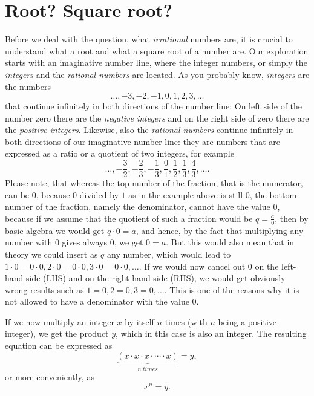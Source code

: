 \documentclass[11pt]{amsart}
\theoremstyle{definition}
\begin{document}
\section{Root? Square root?}
Before we deal with the question, what \emph{irrational} numbers are, it is crucial to understand what a root and what a square root of a number are. Our exploration starts with an imaginative number line, where the integer numbers, or simply the \emph{integers} and the \emph{rational numbers} are located.
As you probably know, \emph{integers} are the numbers
\begin{equation*}
    \dots , -3, -2, -1, 0, 1, 2, 3, \dots
\end{equation*}
that continue infinitely in both directions of the number line:
On left side of the number zero there are the \emph{negative integers} and on the right side of zero there are the \emph{positive integers}.
Likewise, also the \emph{rational numbers} continue infinitely in both directions of our imaginative number line: they are numbers that are expressed as a ratio or a quotient of two integers, for example
\begin{equation*}
    \dots, -\frac{3}{2}, -\frac{2}{3}, -\frac{1}{3}, \frac{0}{1}, \frac{1}{2}, \frac{1}{3}, \frac{4}{3}, \dots .
\end{equation*}
Please note, that whereas the top number of the fraction, that is the numerator, can be \(0\), because \(0\) divided by \(1\) as in the example above is still \(0\), the bottom number of the fraction, namely the denominator, cannot have the value \(0\), because if we assume that the quotient of such a fraction would be \(q = \frac{a}{0}\), then by basic algebra we would get \(q \cdot 0 = a\), and hence, by the fact that multiplying any number with \(0\) gives always \(0\), we get \(0 = a\). But this would also mean that in theory we could insert as \(q\) any number, which would lead to \(1 \cdot 0 = 0 \cdot 0, 2 \cdot 0 = 0 \cdot 0, 3 \cdot 0 = 0 \cdot 0, \dots\). If we would now cancel out \(0\) on the left-hand side (LHS) and on the right-hand side (RHS), we would get obviously wrong results such as \(1 = 0, 2 = 0, 3 = 0, \dots\). This is one of the reasons why it is not allowed to have a denominator with the value \(0\).

If we now multiply an integer \(x\) by itself \(n\) times (with \(n\) being a positive integer), we get the product \(y\), which in this case is also an integer.
The resulting equation can be expressed as
\begin{equation}
    \underbrace{(x \cdot x \cdot x \cdot \cdots \cdot x)}_{n \; times} = y,
\end{equation}
or more conveniently, as
\begin{equation}
    x^{n} = y.
\end{equation}
\end{document}
